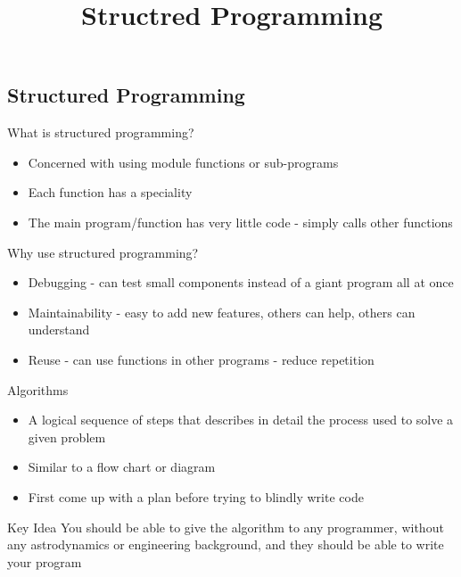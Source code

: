 \documentclass[11pt,professionalfonts]{beamer}
\title[Algorithms]{\large \textbf{Structred Programming}}
\author{\vspace*{-0.3cm}}
\institute{
  \footnotesize
  {\normalsize\bf{Shankar Kulumani}}\\
  \vspace*{0.2cm}
    \textbf{Flight Dynamics \& Control Lab}\\ \vspace*{0.5cm}
  \begin{figure} %
        \texttt{[image: figures/gw\_txh\_2cs\_pos.pdf]}
    \end{figure}
}
\date{}
\begin{document}

\setcounter{framenumber}{-1}
\begin{frame} %
  \titlepage
\end{frame}   %

\section*{}
\subsection*{Structured Programming}  
\begin{frame}{What is structured programming?}
    \begin{itemize}
        \item Concerned with using module functions or sub-programs
        \item Each function has a speciality
        \item The main program/function has very little code - simply calls other functions
    \end{itemize}
\end{frame}

\begin{frame}{Why use structured programming?}
    \begin{itemize}
        \item Debugging - can test small components instead of a giant program all at once
        \item Maintainability - easy to add new features, others can help, others can understand 
        \item Reuse - can use functions in other programs - reduce repetition
    \end{itemize}
\end{frame}

\begin{frame}{Algorithms}
    \begin{itemize}
        \item A logical sequence of steps that describes in detail the process used to solve a given problem
        \item Similar to a flow chart or diagram
        \item First come up with a plan before trying to blindly write code
    \end{itemize}
   
    \pause
    \begin{alertblock}{Key Idea}
        \centering
        You should be able to give the algorithm to any programmer, without any astrodynamics or engineering background, and they should be able to write your program
    \end{alertblock}
\end{frame}
\end{document}
